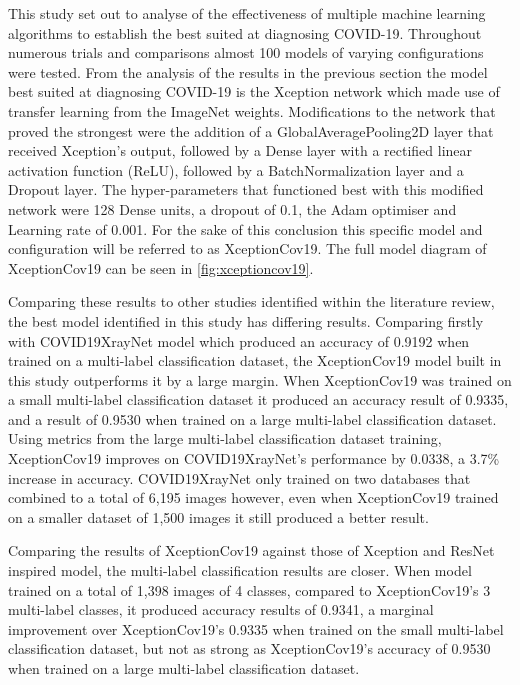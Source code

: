 This study set out to analyse of the effectiveness of multiple machine learning algorithms to establish the best suited at diagnosing COVID-19. Throughout numerous trials and comparisons almost 100 models of varying configurations were tested. From the analysis of the results in the previous section the model best suited at diagnosing COVID-19 is the Xception network which made use of transfer learning from the ImageNet weights. Modifications to the network that proved the strongest were the addition of a GlobalAveragePooling2D layer that received Xception’s output, followed by a Dense layer with a rectified linear activation function (ReLU), followed by a BatchNormalization layer and a Dropout layer. The hyper-parameters that functioned best with this modified network were 128 Dense units, a dropout of 0.1, the Adam optimiser and Learning rate of 0.001. For the sake of this conclusion this specific model and configuration will be referred to as XceptionCov19. The full model diagram of XceptionCov19 can be seen in \autoref{fig:xceptioncov19}.

Comparing these results to other studies identified within the literature review, the best model identified in this study has differing results. Comparing firstly with \cite{zhang2020covid19xraynet} COVID19XrayNet model which produced an accuracy of 0.9192 when trained on a multi-label classification dataset, the XceptionCov19 model built in this study outperforms it by a large margin. When XceptionCov19 was trained on a small multi-label classification dataset it produced an accuracy result of 0.9335, and a result of 0.9530 when trained on a large multi-label classification dataset. Using metrics from the large multi-label classification dataset training, XceptionCov19 improves on COVID19XrayNet's performance by 0.0338, a 3.7\% increase in accuracy. COVID19XrayNet only trained on two databases that combined to a total of 6,195 images however, even when XceptionCov19 trained on a smaller dataset of 1,500 images it still produced a better result.

Comparing the results of XceptionCov19 against those of \cite{fitriasari2021improvement} Xception and ResNet inspired model, the multi-label classification results are closer. When \cite{fitriasari2021improvement} model trained on a total of 1,398 images of 4 classes, compared to XceptionCov19's 3 multi-label classes, it produced accuracy results of 0.9341, a marginal improvement over XceptionCov19's 0.9335 when trained on the small multi-label classification dataset, but not as strong as XceptionCov19's accuracy of 0.9530 when trained on a large multi-label classification dataset.

